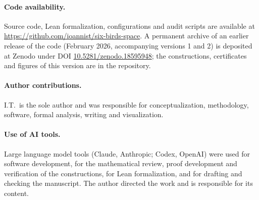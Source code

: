 \paragraph{Code availability.}
Source code, Lean formalization, configurations and audit scripts are available at \url{https://github.com/ioannist/six-birds-space}. A permanent archive of an earlier release of the code (February 2026, accompanying versions 1 and 2) is deposited at Zenodo under DOI \href{https://doi.org/10.5281/zenodo.18595948}{10.5281/zenodo.18595948}; the constructions, certificates and figures of this version are in the repository.

\paragraph{Author contributions.}
I.T.\ is the sole author and was responsible for conceptualization, methodology, software, formal analysis, writing and visualization.

\paragraph{Use of AI tools.}
Large language model tools (Claude, Anthropic; Codex, OpenAI) were used for software development, for the mathematical review, proof development and verification of the constructions, for Lean formalization, and for drafting and checking the manuscript. The author directed the work and is responsible for its content.
